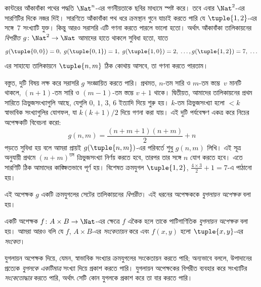 \documentclass[../../../include/open-logic-section]{subfiles}
\begin{document}

\begin{explain}
কান্টরের আঁকাবাঁকা পথের পদ্ধতি $\Nat^n$-এর গণনীয়তাকে ছবির মাধ্যমে স্পষ্ট করে। তবে এবার $\Nat^2$-এর সারণিটির দিকে নজর দিই। সারণিতে আঁকাবাঁকা পথ ধরে ক্রমস্থান গুনে যাচাই করতে পারি যে $\tuple{1,2}$-এর সঙ্গে~$7$ সংখ্যাটি যুক্ত। কিন্তু আরও সরাসরি এটি গণনা করতে পারলে ভালো হতো। অর্থাৎ আঁকাবাঁকা তালিকায়নের \emph{বিপরীত} $g\colon \Nat^2 \to \Nat$ আমাদের হাতে থাকলে সুবিধা হতো, যাতে
\[
g(\tuple{0,0}) = 0, \;
g(\tuple{0,1}) = 1, \;
g(\tuple{1,0}) = 2, \; \dots,
g(\tuple{1,2}) = 7, \; \dots
\]
এর সাহায্যে তালিকায়নে $\tuple{n, m}$ ঠিক কোথায় আসবে, তা গণনা করতে পারতাম।

বস্তুত, দুটি বিষয় লক্ষ করে সরাসরি $g$ সংজ্ঞায়িত করতে পারি। প্রথমত, $n$-তম সারি ও $m$-তম স্তম্ভে~$v$ মানটি থাকলে, $(n+1)$-তম সারি ও $(m-1)$-তম স্তম্ভে $v + 1$ থাকে। দ্বিতীয়ত, আমাদের তালিকায়নের প্রথম সারিতে ত্রিভুজসংখ্যাগুলি আছে, যেগুলি $0$, $1$, $3$, $6$ ইত্যাদি দিয়ে শুরু হয়। $k$-তম ত্রিভুজসংখ্যা হলো $< k$ স্বাভাবিক সংখ্যাগুলির যোগফল, যা $k(k+1)/2$ দিয়ে গণনা করা যায়। এই দুটি পর্যবেক্ষণ একত্র করে নিচের অপেক্ষকটি বিবেচনা করো:
\[
  g(n,m) = \frac{(n+m+1)(n+m)}{2} + n
\]
পড়তে সুবিধা হয় বলে আমরা প্রায়ই $g(\tuple{n, m})$-এর পরিবর্তে শুধু $g(n, m)$ লিখি। এই সূত্র অনুযায়ী প্রথমে $(n+m)^\text{তম}$ ত্রিভুজসংখ্যা নির্ণয় করতে হবে, তারপর তার সঙ্গে $n$ যোগ করতে হবে। এতে সারণিটি ঠিক আমাদের কাঙ্ক্ষিতভাবে পূর্ণ হয়। বিশেষত ক্রমযুগল $\tuple{1, 2}$, $\frac{4 \times 3}{2} +
1 = 7$-এ পাঠানো হয়।

এই অপেক্ষক $g$ একটি ক্রমযুগলের সেটের তালিকায়নের \emph{বিপরীত}। এই ধরনের অপেক্ষককে \emph{যুগলায়ন অপেক্ষক} বলা হয়।
\end{explain}

\begin{defn}[যুগলায়ন অপেক্ষক]
  একটি অপেক্ষক $f\colon A \times B \to \Nat$-এর ক্ষেত্রে $f$ একৈক হলে তাকে পাটিগাণিতিক \emph{যুগলায়ন অপেক্ষক} বলা হয়। আমরা আরও বলি যে $f$, $A \times B$-এর \emph{সংকেতায়ন} করে এবং $f(x,y)$ হলো $\tuple{x,y}$-এর \emph{সংকেত}।
\end{defn}

\begin{explain}
যুগলায়ন অপেক্ষক দিয়ে, যেমন, স্বাভাবিক সংখ্যার ক্রমযুগলের সংকেতায়ন করতে পারি; অন্যভাবে বললে, উপাদানের প্রত্যেক \emph{যুগলকে} \emph{একটিমাত্র} সংখ্যা দিয়ে প্রকাশ করতে পারি। যুগলায়ন অপেক্ষকের বিপরীত ব্যবহার করে সংখ্যাটির \emph{সংকেতোদ্ধার} করতে পারি, অর্থাৎ সেটি কোন যুগলকে প্রকাশ করে তা বার করতে পারি।
\end{explain}
\end{document}
